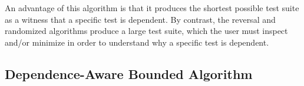 An advantage of this algorithm is that it produces the shortest possible 
test suite as a witness that a specific test is dependent.  By contrast,
the reversal and randomized algorithms produce a large test suite, which
the user must inspect and/or minimize in order to understand why a specific
test is dependent.


\subsection{Dependence-Aware Bounded Algorithm}
\label{sec:advalgorithm}

%
%
%
%
%
%
